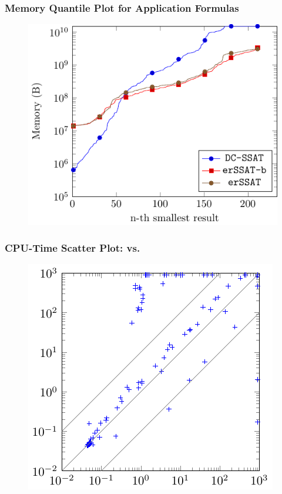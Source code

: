     \begin{frame}
        \frametitle{Memory Quantile Plot for Application Formulas}
        \begin{figure}
            \centering
            \includegraphics{fig/exist-random-ssat/quantile-memory-Application.pdf}
        \end{figure}
    \end{frame}

    \begin{frame}
        \frametitle{CPU-Time Scatter Plot: \erssat vs. \erssatb}
        \begin{figure}
            \centering
            \includegraphics{fig/exist-random-ssat/scatter-erssat.pdf}
        \end{figure}
    \end{frame}

